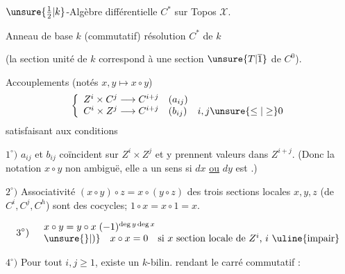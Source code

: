 $\unsure{\frac12|k}$-Algèbre différentielle $C^*$ sur Topos $\mathcal X$.

Anneau de base $k$ (commutatif)
résolution $C^*$ de $k$



(la section unité de $k$ correspond à une section $\unsure{T|\overline1}$ de $C^0$).


Accouplements (notés $x,y\longmapsto x\circ y$)
\[
\left\{\begin{array}{lll}
Z^i\times C^j\longrightarrow C^{i+j}&(a_{ij})\\
C^i\times Z^j\longrightarrow C^{i+j}&(b_{ij})&i,j\unsure{\leq|\geq}0
\end{array}\right.
\]
satisfaisant aux conditions

$1^\circ)$ $a_{ij}$ et $b_{ij}$ coïncident sur $Z^i\times Z^j$ et
y prennent valeurs dans $Z^{i+j}$. (Donc la notation
$x\circ y$ non ambiguë, elle a un  sens si $dx$ \uline{ou} $dy$ est .)

$2^\circ)$ Associativité $(x\circ y)\circ z=x\circ(y\circ z)$ 
des trois sections locales $x,y,z$ (de $C^i,C^j,C^h$)
sont des cocycles; $1\circ x=x\circ1=x$.

\[
3^\circ)\quad\begin{array}{l}
x\circ y=y\circ x\;(-1)^{\deg y\deg x}\\
\unsure{\rbrace|)}\quad x\circ x=0\quad\text{si $x$ section locale de $Z^i$, $i$ \uline{impair}}
\end{array}
\]


$4^\circ)$ Pour tout $i,j\geq1$, existe un $k$-bilin.
rendant le carré commutatif :

